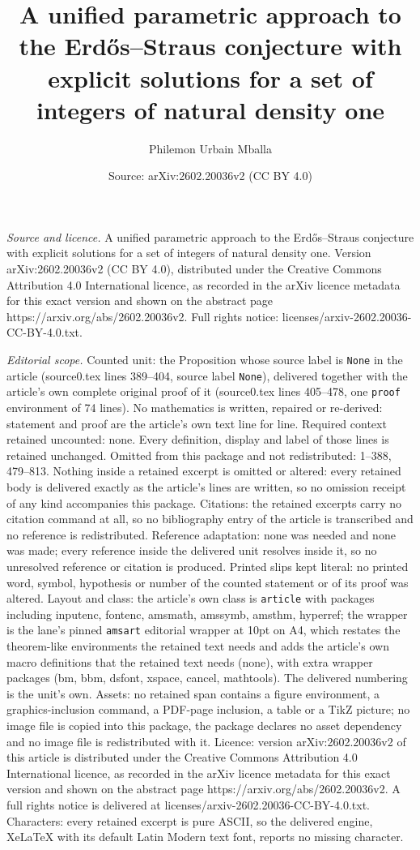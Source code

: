 \documentclass[10pt,a4paper]{amsart}
\title[A unified parametric approach to the Erd\H{o}s--Straus conje]{A unified parametric approach to the Erd\H{o}s--Straus conjecture with explicit solutions for a set of integers of natural density one}
\author{Philemon Urbain Mballa}
\date{Source: arXiv:2602.20036v2 (CC BY 4.0)}
\begin{document}
\maketitle

\noindent\emph{Source and licence.} A unified parametric approach to the Erd\H{o}s--Straus conjecture with explicit solutions for a set of integers of natural density one. Version arXiv:2602.20036v2 (CC BY 4.0), distributed under the Creative Commons Attribution 4.0 International licence, as recorded in the arXiv licence metadata for this exact version and shown on the abstract page https://arxiv.org/abs/2602.20036v2. Full rights notice: licenses/arxiv-2602.20036-CC-BY-4.0.txt.\par\smallskip

\noindent\textit{Editorial scope.} Counted unit: the Proposition whose source label is \texttt{None} in the article (source0.tex lines 389--404, source label \texttt{None}), delivered together with the article's own complete original proof of it (source0.tex lines 405--478, one \texttt{proof} environment of 74 lines). No mathematics is written, repaired or re-derived: statement and proof are the article's own text line for line. Required context retained uncounted: none. Every definition, display and label of those lines is retained unchanged. Omitted from this package and not redistributed: 1--388, 479--813. Nothing inside a retained excerpt is omitted or altered: every retained body is delivered exactly as the article's lines are written, so no omission receipt of any kind accompanies this package. Citations: the retained excerpts carry no citation command at all, so no bibliography entry of the article is transcribed and no reference is redistributed. Reference adaptation: none was needed and none was made; every reference inside the delivered unit resolves inside it, so no unresolved reference or citation is produced. Printed slips kept literal: no printed word, symbol, hypothesis or number of the counted statement or of its proof was altered. Layout and class: the article's own class is \texttt{article} with packages including inputenc, fontenc, amsmath, amssymb, amsthm, hyperref; the wrapper is the lane's pinned \texttt{amsart} editorial wrapper at 10pt on A4, which restates the theorem-like environments the retained text needs and adds the article's own macro definitions that the retained text needs (none), with extra wrapper packages (bm, bbm, dsfont, xspace, cancel, mathtools). The delivered numbering is the unit's own. Assets: no retained span contains a figure environment, a graphics-inclusion command, a PDF-page inclusion, a table or a TikZ picture; no image file is copied into this package, the package declares no asset dependency and no image file is redistributed with it. Licence: version arXiv:2602.20036v2 of this article is distributed under the Creative Commons Attribution 4.0 International licence, as recorded in the arXiv licence metadata for this exact version and shown on the abstract page https://arxiv.org/abs/2602.20036v2. A full rights notice is delivered at licenses/arxiv-2602.20036-CC-BY-4.0.txt. Characters: every retained excerpt is pure ASCII, so the delivered engine, XeLaTeX with its default Latin Modern text font, reports no missing character.
\end{document}
